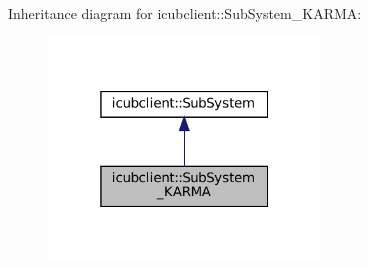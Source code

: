 Inheritance diagram for icubclient\+:\+:Sub\+System\+\_\+\+K\+A\+R\+MA\+:
\nopagebreak
\begin{figure}[H]
\begin{center}
\leavevmode
\includegraphics[width=205pt]{classicubclient_1_1SubSystem__KARMA__inherit__graph}
\end{center}
\end{figure}
